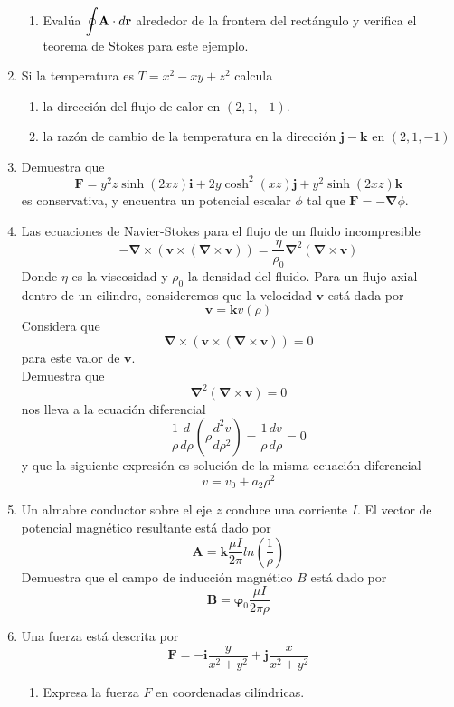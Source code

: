 \documentclass[12pt]{article}
\begin{document}
\begin{enumerate}
\begin{enumerate}
\item Evalúa $\mathlarger{\oint} \mathbf{A} \cdot d \mathbf{r}$ alrededor de la frontera del rectángulo y verifica el teorema de Stokes para este ejemplo.
\end{enumerate}
\item Si la temperatura es $T = x^{2} - xy + z^{2}$ calcula
\begin{enumerate}
\item la dirección del flujo de calor en $(2,1,-1)$.
\item la razón de cambio de la temperatura en la dirección $\mathbf{j}-\mathbf{k}$ en $(2,1,-1)$
\end{enumerate}
\item Demuestra que
\[ \mathbf{F} = y^{2} z \sinh (2xz) \mathbf{i} + 2y \cosh^{2} (xz) \mathbf{j} +  y^{2} \sinh(2xz) \mathbf{k} \]
es conservativa, y encuentra un potencial escalar $\phi$ tal que $\mathbf{F} = - \bm{\nabla} \phi$.
\item Las ecuaciones de Navier-Stokes para el flujo de un fluido incompresible
\[ - \bm{\nabla} \times ( \mathbf{v} \times (\bm{\nabla} \times \mathbf{v} )) =  \dfrac{\eta}{\rho_{0}} \bm{\nabla}^{2} (\bm{\nabla} \times \mathbf{v}) \]
Donde $\eta$ es la viscosidad y $\rho_{0}$ la densidad del fluido. Para un flujo axial dentro de un cilindro, consideremos que la velocidad $\mathbf{v}$ está dada por
\[ \mathbf{v} =  \mathbf{k} v (\rho) \]
Considera que
\[ \bm{\nabla} \times (\mathbf{v} \times (\bm{\nabla} \times \mathbf{v})) = 0 \]
para este valor de $\mathbf{v}$.
\\
Demuestra que
\[ \bm{\nabla}^{2} ( \bm{\nabla} \times \mathbf{v}) = 0  \]
nos lleva a la ecuación diferencial
\[ \dfrac{1}{\rho} \dfrac{d}{d \rho} \left( \rho \dfrac{d^{2} v}{d \rho^{2}} \right) =  \dfrac{1}{\rho} \dfrac{d v}{d \rho} = 0 \]
y que la siguiente expresión es solución de la misma ecuación diferencial
\[ v = v_{0} + a_{2} \rho^{2} \]
\item Un almabre conductor sobre el eje $z$ conduce una corriente $I$. El vector de potencial magnético resultante está dado por
\[ \mathbf{A} = \mathbf{k} \dfrac{\mu I}{2 \pi} ln\left(\dfrac{1}{\rho} \right) \]
Demuestra que el campo de inducción magnético $B$ está dado por
\[ \mathbf{B} = \bm{\varphi}_{0} \dfrac{\mu I}{2 \pi \rho} \]
\item Una fuerza está descrita por
\[ \mathbf{F} = - \mathbf{i} \dfrac{y}{x^{2} + y^{2}} + \mathbf{j} \dfrac{x}{x^{2} + y^{2}} \]
\begin{enumerate}
\item Expresa la fuerza $F$ en coordenadas cilíndricas.

\end{enumerate}
\end{enumerate}
\end{document}
